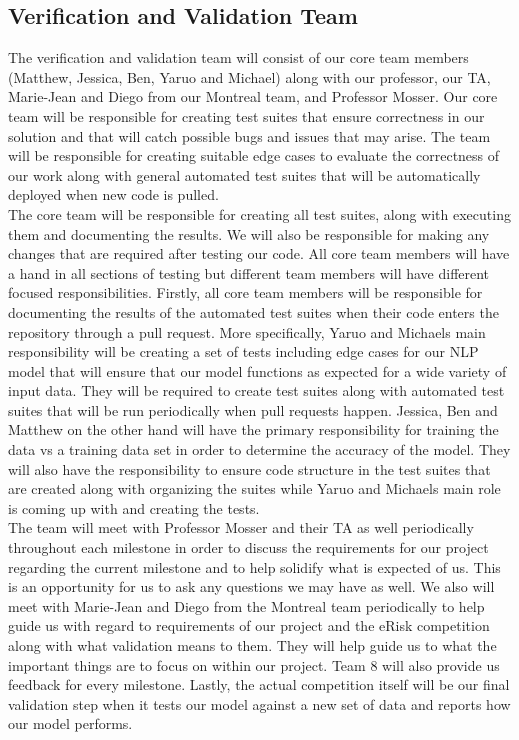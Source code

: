 \documentclass[12pt, titlepage]{article}
\begin{document}
  \subsection{Verification and Validation Team} \label{Verification and Validation Team}

  
  The verification and validation team will consist of our core team members (Matthew, Jessica, Ben, Yaruo and Michael) along with our professor, our TA, Marie-Jean and Diego from our Montreal team, and Professor Mosser.  Our core team will be responsible for creating test suites that ensure correctness in our solution and that will catch possible bugs and issues that may arise. The team will be responsible for creating suitable edge cases to evaluate the correctness of our work along with general automated test suites that will be automatically deployed when new code is pulled.\\
  
  The core team will be responsible for creating all test suites, along with executing them and documenting the results. We will also be responsible for making any changes that are required after testing our code. All core team members will have a hand in all sections of testing but different team members will have different focused responsibilities. Firstly, all core team members will be responsible for documenting the results of the automated test suites when their code enters the repository through a pull request. More specifically, Yaruo and Michaels main responsibility will be creating a set of tests including edge cases for our NLP model that will ensure that our model functions as expected for a wide variety of input data. They will be required to create test suites along with automated test suites that will be run periodically when pull requests happen. Jessica, Ben and Matthew on the other hand will have the primary responsibility for training the data vs a training data set in order to determine the accuracy of the model. They will also have the responsibility to ensure code structure in the test suites that are created along with organizing the suites while Yaruo and Michaels main role is coming up with and creating the tests.\\ 
  
  The team will meet with Professor Mosser and their TA as well periodically throughout each milestone in order to discuss the requirements for our project regarding the current milestone and to help solidify what is expected of us. This is an opportunity for us to ask any questions we may have as well. We also will meet with Marie-Jean and Diego from the Montreal team periodically to help guide us with regard to requirements of our project and the eRisk competition along with what validation means to them. They will help guide us to what the important things are to focus on within our project. Team 8 will also provide us feedback for every milestone. Lastly, the actual competition itself will be our final validation step when it tests our model against a new set of data and reports how our model performs.\\
\end{document}
